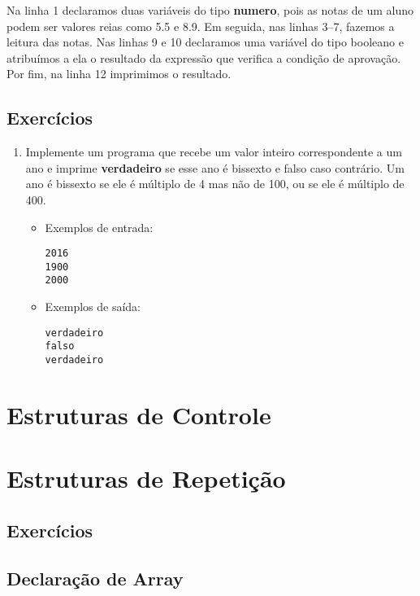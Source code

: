 \documentclass{report}
\begin{document}
Na linha 1 declaramos duas variáveis do tipo \textbf{numero},
pois as notas de um aluno podem ser valores reias como 5.5 e 8.9.
Em seguida, nas linhas 3--7, fazemos a leitura das notas. Nas linhas
9 e 10 declaramos uma variável do tipo booleano e atribuímos a ela
o resultado da expressão que verifica a condição de aprovação. Por fim,
na linha 12 imprimimos o resultado.


\section{Exercícios}

\begin{enumerate}

\item Implemente um programa que recebe um valor inteiro
correspondente a um ano e imprime \textbf{verdadeiro} se
esse ano é bissexto e falso caso contrário. Um ano é bissexto
se ele é múltiplo de 4 mas não de 100, ou se ele é múltiplo de 400.
\begin{itemize}
	\item Exemplos de entrada:
\begin{verbatim}
2016
1900
2000
\end{verbatim}
	\item Exemplos de saída:
\begin{verbatim}
verdadeiro
falso
verdadeiro
\end{verbatim}
\end{itemize}

\end{enumerate}


\chapter{Estruturas de Controle}

\chapter{Estruturas de Repetição}



\section{Exercícios}




\section{Declaração de Array}
\end{document}
